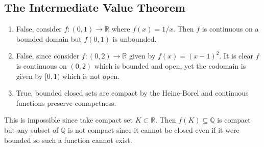 \subsection{The Intermediate Value Theorem}


\begin{enumerate}[label=(\alph*)]
    \item 
    False, consider $f:(0,1)\rightarrow \mathbb{R}$
    where $f(x)=1/x$. Then $f$ is continuous on a 
    bounded domain but $f(0,1)$ is unbounded.

    \item
    False, since consider $f:(0,2) \rightarrow \mathbb{R}$
    given by $f(x)=(x-1)^2$. It is clear $f$ is continuous 
    on $(0,2)$ which is bounded and open, yet the codomain 
    is given by $[0,1)$ which is not open.

    \item
    True, bounded closed sets are compact by the 
    Heine-Borel \Thm and continuous functions preserve 
    comapctness.
\end{enumerate}

This is impossible since take compact set 
$K\subset \mathbb{R}$. Then $f(K)\subseteq \mathbb{Q}$
is compact but any subset of $\mathbb{Q}$ is not 
compact since it cannot be closed even if it were bounded 
so such a function cannot exist.

